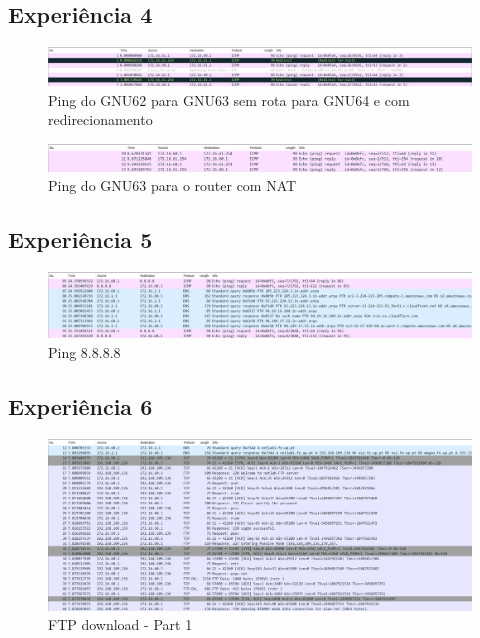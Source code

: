 \documentclass[article, a4paper, 11pt, oneside]{memoir}
\begin{document}
\newpage
\subsection{Experiência 4}
\begin{figure}[h]
	\centering
\includegraphics[scale=0.40]{exp4-step4-ping-gnu63-from-gnu62.png}
\caption{Ping do GNU62 para GNU63 sem rota para GNU64 e com redirecionamento}
\end{figure}

\begin{figure}[h]
	\centering
\includegraphics[scale=0.55]{exp4-step7.png}
\caption{Ping do GNU63 para o router com NAT}
\end{figure}

\newpage
\subsection{Experiência 5}
\begin{figure}[h]
	\centering
\includegraphics[scale=0.55]{exp5-step3.png}
\caption{Ping 8.8.8.8}
\end{figure}


\subsection{Experiência 6}
\begin{figure}[h]
	\centering
\includegraphics[scale=0.55]{exp6-step3-part1.png}
\caption{FTP download - Part 1}
\end{figure}
\end{document}
